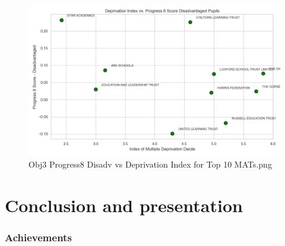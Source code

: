 \documentclass[
  letterpaper,
  DIV=11,
  numbers=noendperiod]{scrartcl}
\begin{document}
\begin{figure}[H]

{\centering \includegraphics{images/Obj3_Progress8 Disadv vs Deprivation Index for Top 10 MATs.png}

}

\caption{Obj3 Progress8 Disadv vs Deprivation Index for Top 10 MATs.png}

\end{figure}%

\section{Conclusion and presentation}\label{conclusion-and-presentation}

\subsubsection{Achievements}\label{achievements}
\end{document}
